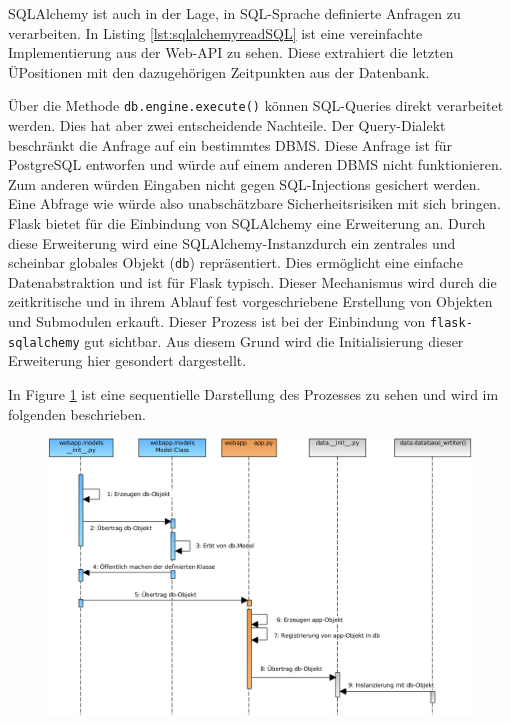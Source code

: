 SQLAlchemy ist auch in der Lage, in SQL-Sprache definierte Anfragen zu verarbeiten. In Listing \ref{lst:sqlalchemyreadSQL} ist eine vereinfachte Implementierung aus der Web-API zu sehen. Diese extrahiert die letzten ÜPositionen mit den dazugehörigen Zeitpunkten aus der Datenbank. 

    
Über die Methode \texttt{db.engine.execute()} können SQL-Queries direkt verarbeitet werden. Dies hat aber zwei entscheidende Nachteile. Der Query-Dialekt beschränkt die Anfrage auf ein bestimmtes DBMS. Diese Anfrage ist für PostgreSQL entworfen und würde auf einem anderen DBMS nicht funktionieren. Zum anderen würden Eingaben nicht gegen SQL-Injections gesichert werden. Eine Abfrage wie 
 würde also unabschätzbare Sicherheitsrisiken mit sich bringen.
\\




Flask bietet für die Einbindung von SQLAlchemy eine Erweiterung an. 
Durch diese Erweiterung wird eine SQLAlchemy-Instanzdurch ein zentrales und scheinbar globales Objekt (\texttt{db}) repräsentiert. Dies ermöglicht eine einfache Datenabstraktion und ist für Flask typisch. Dieser Mechanismus wird durch die zeitkritische und in ihrem Ablauf fest vorgeschriebene Erstellung von Objekten und Submodulen erkauft.
Dieser Prozess ist bei der Einbindung von \texttt{flask-sqlalchemy} gut sichtbar. Aus diesem Grund wird die Initialisierung dieser Erweiterung hier gesondert dargestellt.

In Figure \ref{fig:sequenzSQLALCHEMY} ist eine sequentielle Darstellung des Prozesses zu sehen und wird im folgenden beschrieben. 

\begin{figure}[H]
 \centering
 \includegraphics[width=\textwidth]{pix/seq_db.png}
 \label{fig:sequenzSQLALCHEMY}
\end{figure}


